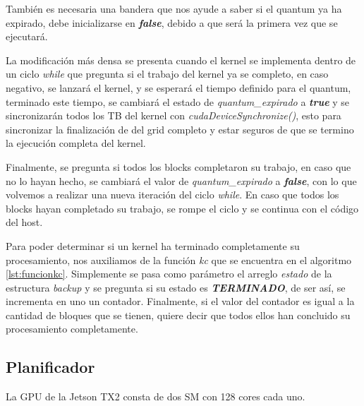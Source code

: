 También es necesaria una bandera que nos ayude a saber si el quantum ya ha expirado, debe inicializarse en \textit{\textbf{false}}, debido a que será la primera vez que se ejecutará. 
\newline

La modificación más densa se presenta cuando el kernel se implementa dentro de un ciclo \textit{while} que pregunta si el trabajo del kernel ya se completo, en caso negativo, se lanzará el kernel, y se esperará el tiempo definido para el quantum, terminado este tiempo, se cambiará el estado de \textit{quantum\_expirado} a \textit{\textbf{true}} y se sincronizarán todos los TB del kernel con \textit{cudaDeviceSynchronize()}, esto para sincronizar la finalización de del grid completo y estar seguros de que se termino la ejecución completa del kernel.
\newline

Finalmente, se pregunta si todos los blocks completaron su trabajo, en caso que no lo hayan hecho, se cambiará el valor de \textit{quantum\_expirado} a  \textit{\textbf{false}}, con lo que volvemos a realizar una nueva iteración del ciclo \textit{while}. En caso que todos los blocks hayan completado su trabajo, se rompe el ciclo y se continua con el código del host.



Para poder determinar si un kernel ha terminado completamente su procesamiento, nos auxiliamos de la función \textit{kc} que se encuentra en el algoritmo \ref{lst:funcionkc}. Simplemente se pasa como parámetro el arreglo \textit{estado} de la estructura \textit{backup} y se pregunta si su estado es \textit{\textbf{TERMINADO}}, de ser así, se incrementa en uno un contador. Finalmente, si el valor del contador es igual a la cantidad de bloques que se tienen, quiere decir que todos ellos han concluido su procesamiento completamente. 




\subsection{Planificador}

La GPU de la Jetson TX2 consta de dos SM con 128 cores cada uno\cite{SMJetson}.

